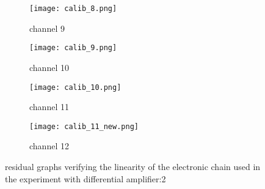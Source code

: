 \documentclass[a4paper, 11pt]{article}
\begin{document}
\begin{figure}[t]

\begin{subfigure}{0.5\textwidth}
\texttt{[image: calib\_8.png]} 
\caption{channel 9}
\label{fig:subim1}
\end{subfigure}
\begin{subfigure}{0.5\textwidth}
\texttt{[image: calib\_9.png]}
\caption{channel 10}
\label{fig:subim2}
\end{subfigure}

\begin{subfigure}{0.5\textwidth}
\texttt{[image: calib\_10.png]} \caption{channel 11}
\label{fig:subim1}
\end{subfigure}
\begin{subfigure}{0.5\textwidth}
\texttt{[image: calib\_11\_new.png]}
\caption{channel 12}
\label{fig:subim2}
\end{subfigure}
 
\caption{residual graphs verifying the linearity of the electronic chain used in the experiment with differential amplifier:2}
\label{fig:image2}
\end{figure}

         
         
         
         
         
         
         
         
\end{document}
